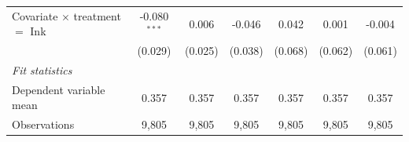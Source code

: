\begin{tabular}{lcccccc}
   Covariate $\times$ treatment $=$ Ink       & -0.080$^{***}$ & 0.006         & -0.046        & 0.042       & 0.001         & -0.004\\   
                                              & (0.029)        & (0.025)       & (0.038)       & (0.068)     & (0.062)       & (0.061)\\   
   \midrule
   \emph{Fit statistics}\\
   Dependent variable mean                    & 0.357          & 0.357         & 0.357         & 0.357       & 0.357         & 0.357\\  
   Observations                               & 9,805          & 9,805         & 9,805         & 9,805       & 9,805         & 9,805\\  
   \midrule \midrule
\end{tabular}
\par\endgroup


